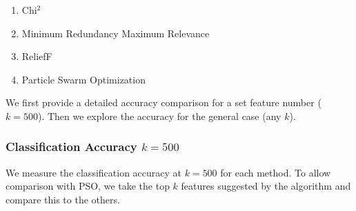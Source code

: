 \documentclass{article}
\begin{document}
\begin{enumerate}
  \item Chi$^2$ \cite{liu1995chi2}
  \item Minimum Redundancy Maximum Relevance \cite{ding2005minimum}
  \item ReliefF \cite{robnik2003theoretical}
  \item Particle Swarm Optimization \cite{kennedy1995particle,kennedy1997discrete}
\end{enumerate}

We first provide a detailed accuracy comparison for a set feature number ($k = 500$).
Then we explore the accuracy for the general case (any $k$).

\subsubsection{Classification Accuracy $k = 500$}

We measure the classification accuracy at $k = 500$ for each method.
To allow comparison with PSO, we take the top $k$ features suggested by the algorithm and compare this to the others.
\end{document}
